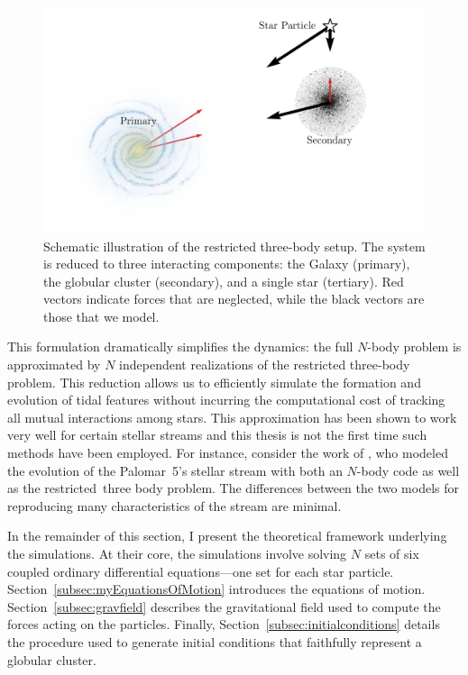     \begin{figure}
        \centering
        \includegraphics[width=.8\linewidth]{images/restricted_three_body_set_up.png}
        \caption{Schematic illustration of the restricted three-body setup. The system is reduced to three interacting components: the Galaxy (primary), the globular cluster (secondary), and a single star (tertiary). Red vectors indicate forces that are neglected, while the black vectors are those that we model.}
        \label{fig:restricted_three_body_set_up}
    \end{figure}

    This formulation dramatically simplifies the dynamics: the full $N$-body problem is approximated by \(N\) independent realizations of the restricted three-body problem. This reduction allows us to efficiently simulate the formation and evolution of tidal features without incurring the computational cost of tracking all mutual interactions among stars. This approximation has been shown to work very well for certain stellar streams and this thesis is not the first time such methods have been employed. For instance, consider the work of \citet{2012A&A...546L...7M}, who modeled the evolution of the Palomar~5's stellar stream with both an $N$-body code as well as the restricted~three body problem. The differences between the two models for reproducing many characteristics of the stream are minimal. 

    In the remainder of this section, I present the theoretical framework underlying the simulations. At their core, the simulations involve solving \(N\) sets of six coupled ordinary differential equations—one set for each star particle. Section~\ref{subsec:myEquationsOfMotion} introduces the equations of motion. Section~\ref{subsec:gravfield} describes the gravitational field used to compute the forces acting on the particles. Finally, Section~\ref{subsec:initialconditions} details the procedure used to generate initial conditions that faithfully represent a globular cluster.



